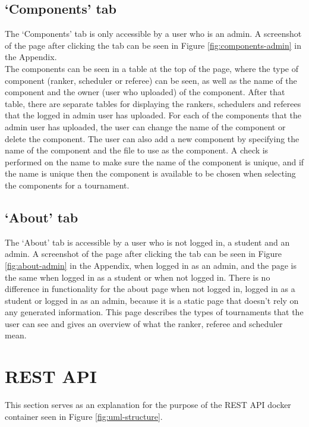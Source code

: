 \documentclass[a4paper, 11pt]{report}
\begin{document}
\subsection{`Components' tab}
\label{sec:impl-tab-components}

The `Components' tab is only accessible by a user who is an admin. A screenshot
of the page after clicking the tab can be seen in Figure \ref{fig:components-admin}
in the Appendix. \\

The components can be seen in a table at the top of the page, where the type of
component (ranker, scheduler or referee) can be seen, as well as the name of the
component and the owner (user who uploaded) of the component. After that table,
there are separate tables for displaying the rankers, schedulers and referees
that the logged in admin user has uploaded. For each of the components that the
admin user has uploaded, the user can change the name of the component or delete
the component. The user can also add a new component by specifying the name of the
component and the file to use as the component. A check is performed on the name
to make sure the name of the component is unique, and if the name is unique then
the component is available to be chosen when selecting the components for a
tournament.

\subsection{`About' tab}
\label{sec:impl-tab-about}

The `About' tab is accessible by a user who is not logged in, a student
and an admin. A screenshot of the page after clicking the tab can be seen in
Figure \ref{fig:about-admin} in the Appendix, when logged in as an admin,
and the page is the same when logged in as a student or when not logged in.
There is no difference in functionality for the about page when not logged in,
logged in as a student or logged in as an admin, because it is a static page
that doesn't rely on any generated information. This page describes the types of
tournaments that the user can see and gives an overview of what the ranker,
referee and scheduler mean.

\section{REST API}

This section serves as an explanation for the purpose of the REST API docker
container seen in Figure \ref{fig:uml-structure}. \\
\end{document}
